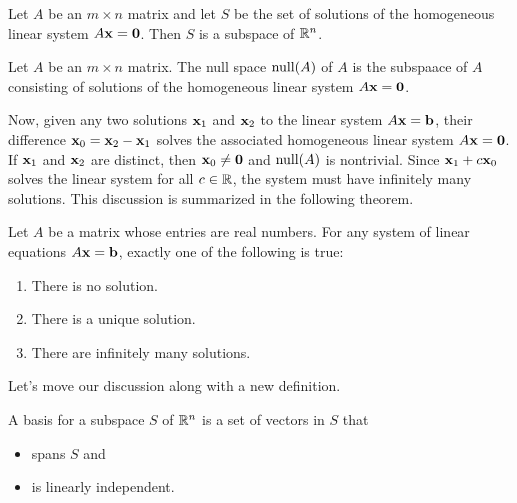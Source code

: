 \documentclass[../m073main.tex]{subfiles}
\begin{document}
\pagebreak

\begin{theorem}
	Let $A$ be an $m\times n$ matrix and let $S$ be the set of solutions of the homogeneous linear system $A\mathbf{x} = \mathbf{0}$.
	Then $S$ is a subspace of $\mathbb{R}^n$.
\end{theorem}

\begin{definition}
	Let $A$ be an $m\times n$ matrix.
	The null space $\textrm{null}(A)$ of $A$ is the subspaace of $A$ consisting of solutions of the homogeneous linear system $A\mathbf{x} = \mathbf{0}$.
\end{definition}

Now, given any two solutions $\mathbf{x}_1$ and $\mathbf{x}_2$ to the linear system $A\mathbf{x} = \mathbf{b}$, their difference $\mathbf{x}_0 = \mathbf{x}_2 - \mathbf{x}_1$ solves the associated homogeneous linear system $A\mathbf{x} = \mathbf{0}$.
If $\mathbf{x}_1$ and $\mathbf{x}_2$ are distinct, then $\mathbf{x}_0 \neq \mathbf{0}$ and $\textrm{null} (A)$ is nontrivial.
Since $\mathbf{x}_1 + c\mathbf{x}_0$ solves the linear system for all $c \in \mathbb{R}$, the system must have infinitely many solutions.
This discussion is summarized in the following theorem.

\begin{theorem}
	Let $A$ be a matrix whose entries are real numbers.
	For any system of linear equations $A\mathbf{x} = \mathbf{b}$, exactly one of the following is true:
	\begin{enumerate}[label=(\alph*)]
		\item There is no solution.
		\item There is a unique solution.
		\item There are infinitely many solutions.
	\end{enumerate}
\end{theorem}

Let's move our discussion along with a new definition.

\begin{definition}
	A basis for a subspace $S$ of $\mathbb{R}^n$ is a set of vectors in $S$ that
	\begin{itemize}
		\item spans $S$ and
		\item is linearly independent.
	\end{itemize}
\end{definition}
\end{document}
